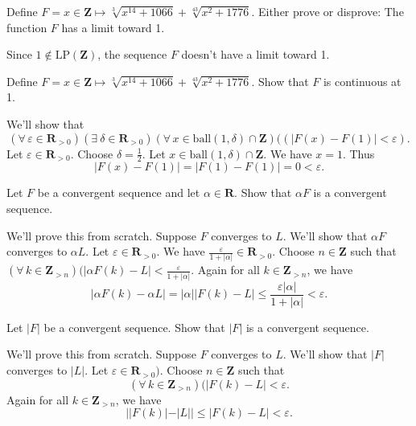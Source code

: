\documentclass[12pt,fleqn,answers]{exam}
\newcommand{\reals}{\mathbf{R}}
\newcommand{\ball}{\mathrm{ball}}
\newcommand{\integers}{\mathbf{Z}}
\newcommand{\LP}{\mathrm{LP}}
\let\oldforall\forall
\renewcommand{\forall}{\oldforall \, }
\let\oldexist\exists
\renewcommand{\exists}{\oldexist \: }
\begin{document}
\begin{questions}
\begin{solution}
\end{solution}

\question   Define  \(F =  x \in \integers \mapsto \sqrt[3]{x^{14} + 1066} + \sqrt[43]{x^2 + 1776}\).
Either prove or disprove: 
  The function \(F\) has a limit toward 1.

\begin{solution}
Since $1 \notin \LP(\integers)$, the sequence $F$ doesn't have a limit toward 1.

\end{solution}

\question   Define $F =  x \in \integers \mapsto \sqrt[3]{x^{14} + 1066} + \sqrt[43]{x^2 + 1776}.$ Show that
$F$  is continuous at 1.
\begin{solution}
We'll show that
\[
  (\forall \varepsilon \in \reals_{>0})(\exists \delta \in \reals_{>0})(\forall x \in \ball(1,\delta) \cap \integers)(
  (|F(x) - F(1)| < \varepsilon).
\]
Let $ \varepsilon \in \reals_{>0}$. Choose $\delta = \frac{1}{2}$.  Let $x \in \ball(1,\delta) \cap \integers$. We have
$x = 1$. Thus  $$|F(x) - F(1)|  = |F(1) - F(1)| = 0 < \varepsilon.$$
\end{solution}



\question  Let \(F\) be a convergent sequence and let \(\alpha \in \reals\).  Show that \(\alpha F\) is a convergent sequence.

\begin{solution} We'll prove this from scratch.  
  Suppose $F$ converges to $L$. We'll show that $\alpha F$ converges 
  to $\alpha L$.
Let $\varepsilon \in \reals_{>0}$.  
We have $\frac{\varepsilon}{1+|\alpha|} \in \reals_{>0}$. 
Choose $n \in \integers$ such that 
$(\forall k \in \integers_{>n})(|\alpha F(k) - L | <  \frac{\varepsilon}{1+|\alpha|}$.  
Again for all $k \in \integers_{>n}$, we have
\[
  |\alpha F(k) - \alpha L| = |\alpha| |F(k) - L| \leq \frac{\varepsilon |\alpha|}{1+|\alpha|} < \varepsilon.
\]



\end{solution}
\question  Let \(|F| \) be a convergent sequence.  Show that \(|F| \) is a convergent sequence.
\begin{solution}
We'll prove this from scratch.  Suppose $F$ converges to $L$. We'll show that $|F|$ converges to $|L|$.
Let $\varepsilon \in \reals_{>0})$. Choose $n \in \integers$ such that 
$$(\forall k \in \integers_{>n})(|F(k) - L | <  \varepsilon.$$  
Again for all $k \in \integers_{>n}$, we have
\[
  ||F(k)| - |L||  \leq |F(k) - L|  < \varepsilon.
\]
\end{solution}


\end{questions}
\end{document}
